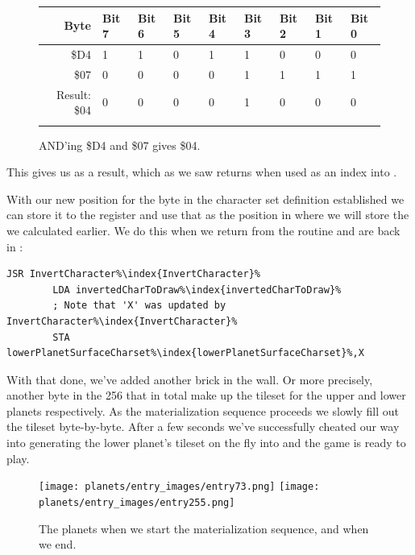 \begin{figure}[H]
  {
    \setlength{\tabcolsep}{3.0pt}
    \setlength\cmidrulewidth{\heavyrulewidth} %
    \begin{adjustbox}{width=10cm,center}

      \begin{tabular}{rllllllll}
        \toprule
        Byte & Bit 7 & Bit 6 & Bit 5 & Bit 4 & Bit 3 & Bit 2 & Bit 1 & Bit 0        \\
        \midrule
        \$D4 & 1 & 1 & 0 & 1 & 1 & 0 & 0 & 0 \\
        \$07 & 0 & 0 & 0 & 0 & 1 & 1 & 1 & 1 \\
        \midrule
        Result: \$04 & 0 & 0 & 0 & 0 & 1 & 0 & 0 & 0 \\
        \addlinespace
        \bottomrule
      \end{tabular}

    \end{adjustbox}

  }\caption*{AND'ing \$D4 and \$07 gives \$04.}
\end{figure}

This gives us  as a result, which as we saw returns  when used as an index
into .

With our new position for the byte in the character set definition established we can store it to the
 register and use that as the position in  where we will
store the  we calculated earlier. We do this when we return from the
 routine and are back in :

\begin{lstlisting}[escapechar=\%]
        JSR InvertCharacter%\index{InvertCharacter}%
        LDA invertedCharToDraw%\index{invertedCharToDraw}%
        ; Note that 'X' was updated by InvertCharacter%\index{InvertCharacter}%
        STA lowerPlanetSurfaceCharset%\index{lowerPlanetSurfaceCharset}%,X
\end{lstlisting}

With that done, we've added another brick in the wall. Or more precisely, another byte in the 
256 that in total make up the tileset for the upper and lower planets respectively. As the 
materialization sequence proceeds we slowly fill out the tileset byte-by-byte. After a few
seconds we've successfully cheated our way into generating the lower planet's tileset on the
fly into  and the game is ready to play.

\begin{figure}[H]
    \centering
      \texttt{[image: planets/entry\_images/entry73.png]}%
      \texttt{[image: planets/entry\_images/entry255.png]}%
\caption{The planets when we start the materialization sequence, and when we end.}
\end{figure}
